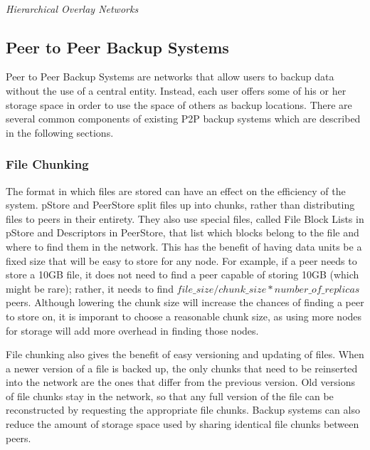 \documentclass[a4paper]{article}
\begin{document}
\hfill \\
\textit{Hierarchical Overlay Networks}
\hfill \\

\subsection{Peer to Peer Backup Systems}
Peer to Peer Backup Systems are networks that allow users to backup data without the use of a central entity. Instead, each user offers some of his or her storage space in order to use the space of others as backup locations. There are several common components of existing P2P backup systems which are described in the following sections.

\subsubsection{File Chunking}
The format in which files are stored can have an effect on the efficiency of the system. pStore and PeerStore split files up into chunks, rather than distributing files to peers in their entirety. They also use special files, called File Block Lists in pStore and Descriptors in PeerStore, that list which blocks belong to the file and where to find them in the network. This has the benefit of having data units be a fixed size that will be easy to store for any node. For example, if a peer needs to store a 10GB file, it does not need to find a peer capable of storing 10GB (which might be rare); rather, it needs to find $file\_size/chunk\_size*number\_of\_replicas$ peers. Although lowering the chunk size will increase the chances of finding a peer to store on, it is imporant to choose a reasonable chunk size, as using more nodes for storage will add more overhead in finding those nodes.

File chunking also gives the benefit of easy versioning and updating of files. When a newer version of a file is backed up, the only chunks that need to be reinserted into the network are the ones that differ from the previous version. Old versions of file chunks stay in the network, so that any full version of the file can be reconstructed by requesting the appropriate file chunks. Backup systems can also reduce the amount of storage space used by sharing identical file chunks between peers.
\end{document}
